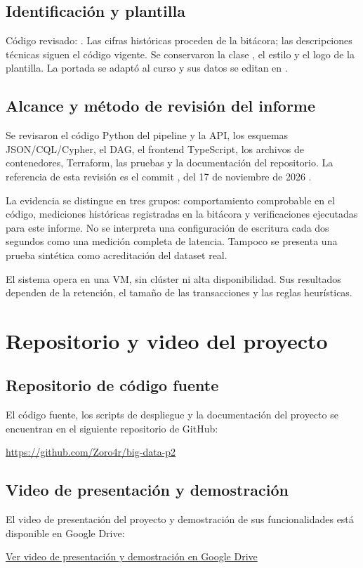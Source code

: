 \section{Identificación y plantilla}
Código revisado: \texttt{\RevisionCodigo}. Las cifras históricas proceden de la bitácora; las descripciones técnicas siguen el código vigente. Se conservaron la clase , el estilo  y el logo de la plantilla. La portada se adaptó al curso y sus datos se editan en .

\section{Alcance y método de revisión del informe}
Se revisaron el código Python del pipeline y la API, los esquemas JSON/CQL/Cypher, el DAG, el frontend TypeScript, los archivos de contenedores, Terraform, las pruebas y la documentación del repositorio. La referencia de esta revisión es el commit \texttt{\RevisionCodigo}, del 17 de noviembre de 2026 \cite{repo}.

La evidencia se distingue en tres grupos: comportamiento comprobable en el código, mediciones históricas registradas en la bitácora y verificaciones ejecutadas para este informe. No se interpreta una configuración de escritura cada dos segundos como una medición completa de latencia. Tampoco se presenta una prueba sintética como acreditación del dataset real.

El sistema opera en una VM, sin clúster ni alta disponibilidad. Sus resultados dependen de la retención, el tamaño de las transacciones y las reglas heurísticas.

\chapter{Repositorio y video del proyecto}
\label{anexo:enlaces}

\section{Repositorio de código fuente}
El código fuente, los scripts de despliegue y la documentación del proyecto se encuentran en el siguiente repositorio de GitHub:

\url{https://github.com/Zoro4r/big-data-p2}

\section{Video de presentación y demostración}
El video de presentación del proyecto y demostración de sus funcionalidades está disponible en Google Drive:

\href{https://drive.google.com/file/d/1apDLdxLH9IPj59bEqh5vpRcEIbTyGk9o/view?usp=sharing}{Ver video de presentación y demostración en Google Drive}
